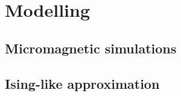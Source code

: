 \newpage
\section{Modelling}
\subsection{Micromagnetic simulations}

\subsection{Ising-like approximation}

